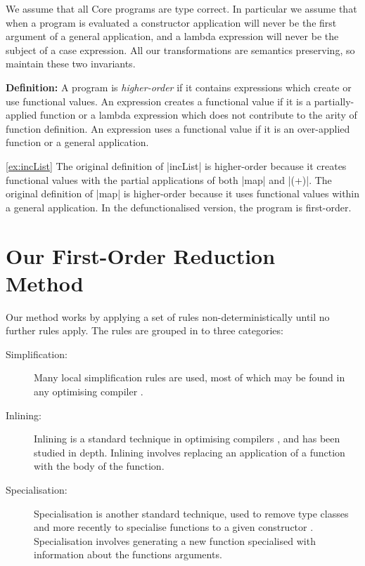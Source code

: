\documentclass[preprint]{sigplanconf}
\newenvironment{definition}
    {\smallskip
     \noindent\textbf{Definition:}}
    {\noexample}
\begin{document}
We assume that all Core programs are type correct. In particular we assume that when a program is evaluated a constructor application will never be the first argument of a general application, and a lambda expression will never be the subject of a case expression. All our transformations are semantics preserving, so maintain these two invariants.

\begin{definition}
A program is \textit{higher-order} if it contains expressions which create or use functional values. An expression creates a functional value if it is a partially-applied function or a lambda expression which does not contribute to the arity of function definition. An expression uses a functional value if it is an over-applied function or a general application.
\end{definition}

\begin{examplerevisit}{\ref{ex:incList}}
The original definition of |incList| is higher-order because it creates functional values with the partial applications of both |map| and |(+)|. The original definition of |map| is higher-order because it uses functional values within a general application. In the defunctionalised version, the program is first-order.
\end{examplerevisit}

\section{Our First-Order Reduction Method}
\label{sec:overview}

Our method works by applying a set of rules non-deterministically until no further rules apply. The rules are grouped in to three categories:

\begin{description}
\item[Simplification:] Many local simplification rules are used, most of which may be found in any optimising compiler \cite{spj:transformation}.
\item[Inlining:] Inlining is a standard technique in optimising compilers \cite{spj:inlining}, and has been studied in depth. Inlining involves replacing an application of a function with the body of the function.
\item[Specialisation:] Specialisation is another standard technique, used to remove type classes \cite{jones:dictionary_free} and more recently to specialise functions to a given constructor \cite{spj:specconstr}. Specialisation involves generating a new function specialised with information about the functions arguments.
\end{description}
\end{document}
